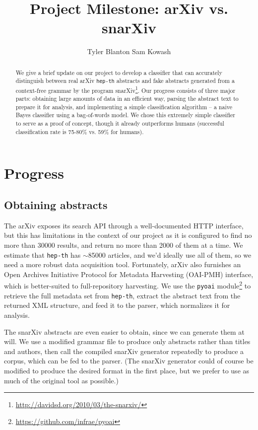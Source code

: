 \documentclass{article}
\title{Project Milestone: arXiv vs. snarXiv}
\author{Tyler Blanton \And Sam Kowash}
\begin{document}

\maketitle

\begin{abstract}
  We give a brief update on our project to develop a classifier that can accurately distinguish between real arXiv \texttt{hep-th} abstracts and fake abstracts generated from a context-free grammar by the program snarXiv\footnote{\url{http://davidsd.org/2010/03/the-snarxiv/}}.
  Our progress consists of three major parts: obtaining large amounts of data in an efficient way, parsing the abstract text to prepare it for analysis, and implementing a simple classification algorithm -- a naive Bayes classifier using a bag-of-words model.
  We chose this extremely simple classifier to serve as a proof of concept, though it already outperforms humans (successful classification rate is 75-80\% vs. 59\% for humans).
\end{abstract}




\section{Progress}
\label{sec:progress}
\subsection{Obtaining abstracts}
The arXiv exposes its search API through a well-documented HTTP interface, but this has limitations in the context of our project as it is configured to find no more than 30000 results, and return no more than 2000 of them at a time.
We estimate that \texttt{hep-th} has $\sim$85000 articles, and we'd ideally use all of them, so we need a more robust data acquisition tool.
Fortunately, arXiv also furnishes an Open Archives Initiative Protocol for Metadata Harvesting (OAI-PMH) interface, which is better-suited to full-repository harvesting. We use the \texttt{pyoai} module\footnote{\url{https://github.com/infrae/pyoai}} to retrieve the full metadata set from \texttt{hep-th}, extract the abstract text from the returned XML structure, and feed it to the parser, which normalizes it for analysis.

The snarXiv abstracts are even easier to obtain, since we can generate them at will.
We use a modified grammar file to produce only abstracts rather than titles and authors, then call the compiled snarXiv generator repeatedly to produce a corpus, which can be fed to the parser.
(The snarXiv generator could of course be modified to produce the desired format in the first place, but we prefer to use as much of the original tool as possible.)
\end{document}
